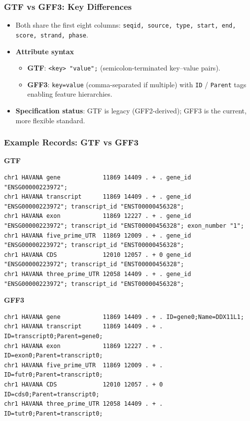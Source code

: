 \documentclass[aspectratio=169]{beamer}
\begin{document}
\begin{frame}
  \frametitle{GTF vs GFF3: Key Differences}
  \begin{itemize}
    \item Both share the first eight columns: \texttt{seqid, source, type, start, end, score, strand, phase}.
    \item \textbf{Attribute syntax}
      \begin{itemize}
        \item \textbf{GTF}: \texttt{<key> "value";} (semicolon-terminated key–value pairs).
        \item \textbf{GFF3}: \texttt{key=value} (comma-separated if multiple) with \texttt{ID} / \texttt{Parent} tags enabling feature hierarchies.
      \end{itemize}
    \item \textbf{Specification status}: GTF is legacy (GFF2-derived); GFF3 is the current, more flexible standard.
  \end{itemize}
\end{frame}

\begin{frame}[fragile]
  \frametitle{Example Records: GTF vs GFF3}
  {\tiny
  \textbf{GTF}\vspace{0.2em}\\
\begin{verbatim}
chr1 HAVANA gene            11869 14409 . + . gene_id "ENSG00000223972";
chr1 HAVANA transcript      11869 14409 . + . gene_id "ENSG00000223972"; transcript_id "ENST00000456328";
chr1 HAVANA exon            11869 12227 . + . gene_id "ENSG00000223972"; transcript_id "ENST00000456328"; exon_number "1";
chr1 HAVANA five_prime_UTR  11869 12009 . + . gene_id "ENSG00000223972"; transcript_id "ENST00000456328";
chr1 HAVANA CDS             12010 12057 . + 0 gene_id "ENSG00000223972"; transcript_id "ENST00000456328";
chr1 HAVANA three_prime_UTR 12058 14409 . + . gene_id "ENSG00000223972"; transcript_id "ENST00000456328";
\end{verbatim}
  \vspace{0.4em}
  \textbf{GFF3}\vspace{0.2em}\\
\begin{verbatim}
chr1 HAVANA gene            11869 14409 . + . ID=gene0;Name=DDX11L1;
chr1 HAVANA transcript      11869 14409 . + . ID=transcript0;Parent=gene0;
chr1 HAVANA exon            11869 12227 . + . ID=exon0;Parent=transcript0;
chr1 HAVANA five_prime_UTR  11869 12009 . + . ID=futr0;Parent=transcript0;
chr1 HAVANA CDS             12010 12057 . + 0 ID=cds0;Parent=transcript0;
chr1 HAVANA three_prime_UTR 12058 14409 . + . ID=tutr0;Parent=transcript0;
\end{verbatim}}
\end{frame}
\end{document}
